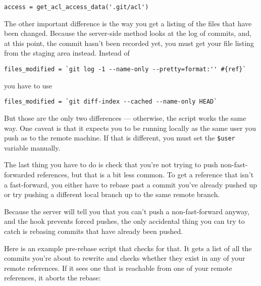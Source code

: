 \documentclass[a4paper]{book}
\begin{document}
\begin{shaded}\begin{verbatim}
access = get_acl_access_data('.git/acl')
\end{verbatim}\end{shaded}

The other important difference is the way you get a listing of the files that have been changed. Because the server-side method looks at the log of commits, and, at this point, the commit hasn't been recorded yet, you must get your file listing from the staging area instead. Instead of

\begin{shaded}\begin{verbatim}
files_modified = `git log -1 --name-only --pretty=format:'' #{ref}`
\end{verbatim}\end{shaded}

you have to use

\begin{shaded}\begin{verbatim}
files_modified = `git diff-index --cached --name-only HEAD`
\end{verbatim}\end{shaded}

But those are the only two differences --- otherwise, the script works the same way. One caveat is that it expects you to be running locally as the same user you push as to the remote machine. If that is different, you must set the \texttt{\$user} variable manually.

The last thing you have to do is check that you're not trying to push non-fast-forwarded references, but that is a bit less common. To get a reference that isn't a fast-forward, you either have to rebase past a commit you've already pushed up or try pushing a different local branch up to the same remote branch.

Because the server will tell you that you can't push a non-fast-forward anyway, and the hook prevents forced pushes, the only accidental thing you can try to catch is rebasing commits that have already been pushed.

Here is an example pre-rebase script that checks for that. It gets a list of all the commits you're about to rewrite and checks whether they exist in any of your remote references. If it sees one that is reachable from one of your remote references, it aborts the rebase:
\end{document}
